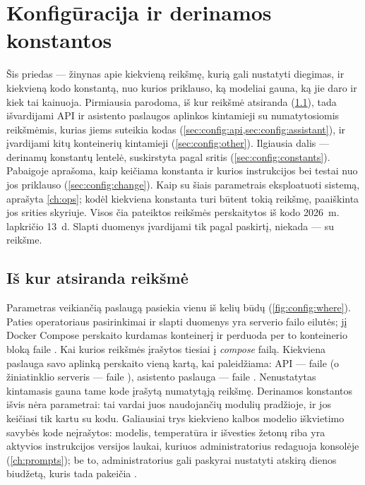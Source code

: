 \chapter{Konfigūracija ir derinamos konstantos}\label{app:config}

Šis priedas --- žinynas apie kiekvieną reikšmę, kurią gali nustatyti diegimas, ir kiekvieną kodo
konstantą, nuo kurios priklauso, ką modeliai gauna, ką jie daro ir kiek tai kainuoja. Pirmiausia
parodoma, iš kur reikšmė atsiranda (\cref{sec:config:where}), tada išvardijami API ir asistento
paslaugos aplinkos kintamieji su numatytosiomis reikšmėmis, kurias jiems suteikia kodas
(\cref{sec:config:api,sec:config:assistant}), ir įvardijami kitų konteinerių kintamieji
(\cref{sec:config:other}). Ilgiausia dalis --- derinamų konstantų lentelė, suskirstyta pagal
sritis (\cref{sec:config:constants}). Pabaigoje aprašoma, kaip keičiama konstanta ir kurios
instrukcijos bei testai nuo jos priklauso (\cref{sec:config:change}). Kaip su šiais parametrais
eksploatuoti sistemą, aprašyta \cref{ch:ops}; kodėl kiekviena konstanta turi būtent tokią
reikšmę, paaiškinta jos srities skyriuje. Visos čia pateiktos reikšmės perskaitytos iš kodo
2026~m. lapkričio 13~d. Slapti duomenys įvardijami tik pagal paskirtį, niekada --- su reikšme.


\section{Iš kur atsiranda reikšmė}\label{sec:config:where}

Parametras veikiančią paslaugą pasiekia vienu iš kelių būdų (\cref{fig:config:where}). Paties
operatoriaus pasirinkimai ir slapti duomenys yra serverio failo  eilutės; jį Docker
Compose perskaito kurdamas konteinerį ir perduoda per to konteinerio  bloką
faile . Kai kurios reikšmės įrašytos tiesiai į \textit{compose} failą.
Kiekviena paslauga savo aplinką perskaito vieną kartą, kai paleidžiama: API --- faile
 (o žiniatinklio serveris --- faile ), asistento
paslauga --- faile . Nenustatytas kintamasis gauna tame kode įrašytą numatytąją
reikšmę. Derinamos konstantos išvis nėra parametrai: tai vardai juos naudojančių modulių
pradžioje, ir jos keičiasi tik kartu su kodu. Galiausiai trys kiekvieno kalbos modelio
iškvietimo savybės kode neįrašytos: modelis, temperatūra ir išvesties žetonų riba yra aktyvios
instrukcijos versijos laukai, kuriuos administratorius redaguoja konsolėje (\cref{ch:prompts});
be to, administratorius gali paskyrai nustatyti atskirą dienos biudžetą, kuris tada pakeičia
.

